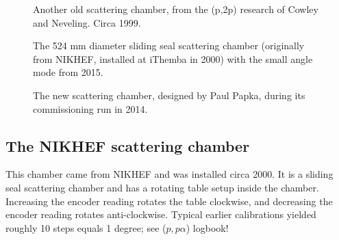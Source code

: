 \documentclass[11pt]{report}
\begin{document}
\begin{figure}[!ht]
\centerline{\vspace{0cm}\hspace{0cm}
}
\centering
\caption{Another old scattering chamber, from the (p,2p) research of Cowley and Neveling. Circa 1999.}
\label{fig:old-scat-chamber-2}
\end{figure} 

\begin{figure}[!ht]
\centerline{\vspace{0cm}\hspace{0cm}
}
\centering
\caption{The 524 mm diameter sliding seal scattering chamber (originally from NIKHEF, installed at iThemba in 2000) with the small angle mode from 2015.}
\label{fig:slidingseal-scat-chamber}
\end{figure} 

\begin{figure}[!ht]
\centerline{\vspace{0cm}\hspace{0cm}
}
\centering
\caption{The new scattering chamber, designed by Paul Papka, during its commissioning run in 2014.}
\label{fig:new-scat-chamber}
\end{figure} 




\subsection{The NIKHEF scattering chamber}

This chamber came from NIKHEF and was installed circa 2000.
It is a sliding seal scattering chamber and has a rotating table setup inside the chamber.
Increasing the encoder reading rotates the table clockwise, and decreasing the
encoder reading rotates anti-clockwise.
Typical earlier calibrations yielded roughly 10 steps equals 1 degree; see ($p,p \alpha$) logbook!
\end{document}
